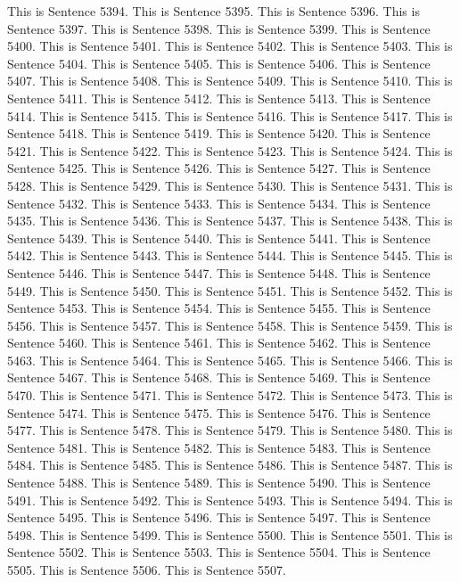\documentclass{article}
\begin{document}
This is Sentence 5394.
This is Sentence 5395.
This is Sentence 5396.
This is Sentence 5397.
This is Sentence 5398.
This is Sentence 5399.
This is Sentence 5400.
This is Sentence 5401.
This is Sentence 5402.
This is Sentence 5403.
This is Sentence 5404.
This is Sentence 5405.
This is Sentence 5406.
This is Sentence 5407.
This is Sentence 5408.
This is Sentence 5409.
This is Sentence 5410.
This is Sentence 5411.
This is Sentence 5412.
This is Sentence 5413.
This is Sentence 5414.
This is Sentence 5415.
This is Sentence 5416.
This is Sentence 5417.
This is Sentence 5418.
This is Sentence 5419.
This is Sentence 5420.
This is Sentence 5421.
This is Sentence 5422.
This is Sentence 5423.
This is Sentence 5424.
This is Sentence 5425.
This is Sentence 5426.
This is Sentence 5427.
This is Sentence 5428.
This is Sentence 5429.
This is Sentence 5430.
This is Sentence 5431.
This is Sentence 5432.
This is Sentence 5433.
This is Sentence 5434.
This is Sentence 5435.
This is Sentence 5436.
This is Sentence 5437.
This is Sentence 5438.
This is Sentence 5439.
This is Sentence 5440.
This is Sentence 5441.
This is Sentence 5442.
This is Sentence 5443.
This is Sentence 5444.
This is Sentence 5445.
This is Sentence 5446.
This is Sentence 5447.
This is Sentence 5448.
This is Sentence 5449.
This is Sentence 5450.
This is Sentence 5451.
This is Sentence 5452.
This is Sentence 5453.
This is Sentence 5454.
This is Sentence 5455.
This is Sentence 5456.
This is Sentence 5457.
This is Sentence 5458.
This is Sentence 5459.
This is Sentence 5460.
This is Sentence 5461.
This is Sentence 5462.
This is Sentence 5463.
This is Sentence 5464.
This is Sentence 5465.
This is Sentence 5466.
This is Sentence 5467.
This is Sentence 5468.
This is Sentence 5469.
This is Sentence 5470.
This is Sentence 5471.
This is Sentence 5472.
This is Sentence 5473.
This is Sentence 5474.
This is Sentence 5475.
This is Sentence 5476.
This is Sentence 5477.
This is Sentence 5478.
This is Sentence 5479.
This is Sentence 5480.
This is Sentence 5481.
This is Sentence 5482.
This is Sentence 5483.
This is Sentence 5484.
This is Sentence 5485.
This is Sentence 5486.
This is Sentence 5487.
This is Sentence 5488.
This is Sentence 5489.
This is Sentence 5490.
This is Sentence 5491.
This is Sentence 5492.
This is Sentence 5493.
This is Sentence 5494.
This is Sentence 5495.
This is Sentence 5496.
This is Sentence 5497.
This is Sentence 5498.
This is Sentence 5499.
This is Sentence 5500.
This is Sentence 5501.
This is Sentence 5502.
This is Sentence 5503.
This is Sentence 5504.
This is Sentence 5505.
This is Sentence 5506.
This is Sentence 5507.
\end{document}
